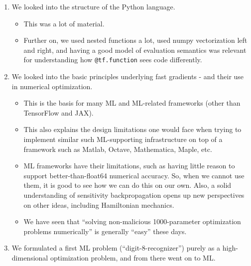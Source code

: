 \documentclass[11pt]{article}
\providecommand{\tightlist}{%
      \setlength{\itemsep}{0pt}\setlength{\parskip}{0pt}}
\begin{document}
\begin{enumerate}
\def\labelenumi{\arabic{enumi}.}
\item
  We looked into the structure of the Python language.

  \begin{itemize}
  \tightlist
  \item
    This was a lot of material.
  \item
    Further on, we used nested functions a lot, used numpy vectorization
    left and right, and having a good model of evaluation semantics was
    relevant for understanding how \texttt{@tf.function} sees code
    differently.
  \end{itemize}
\item
  We looked into the basic principles underlying fast gradients - and
  their use in numerical optimization.

  \begin{itemize}
  \tightlist
  \item
    This is the basis for many ML and ML-related frameworks (other than
    TensorFlow and JAX).
  \item
    This also explains the design limitations one would face when trying
    to implement similar such ML-supporting infrastructure on top of a
    framework such as Matlab, Octave, Mathematica, Maple, etc.
  \item
    ML frameworks have their limitations, such as having little reason
    to support better-than-float64 numerical accuracy. So, when we
    cannot use them, it is good to see how we can do this on our own.
    Also, a solid understanding of sensitivity backpropagation opens up
    new perspectives on other ideas, including Hamiltonian mechanics.
  \item
    We have seen that ``solving non-malicious 1000-parameter
    optimization problems numerically'' is generally ``easy'' these
    days.
  \end{itemize}
\item
  We formulated a first ML problem (``digit-8-recognizer'') purely as a
  high-dimensional optimization problem, and from there went on to ML.


\end{enumerate}
\end{document}
